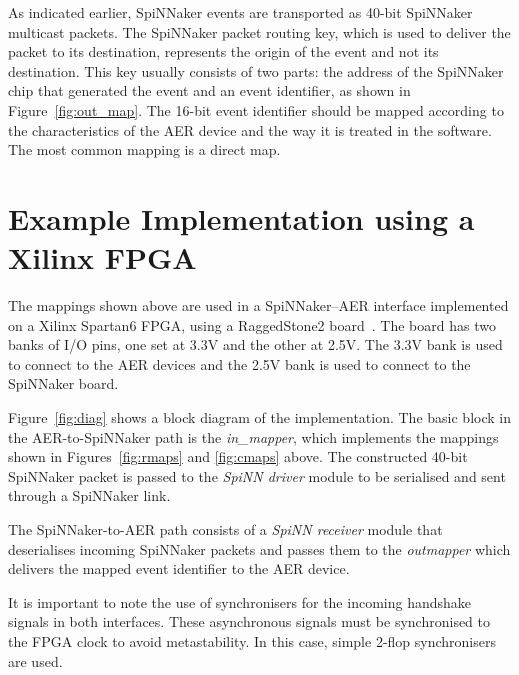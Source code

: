 As indicated earlier, SpiNNaker events are transported as 40-bit SpiNNaker multicast packets. The SpiNNaker packet routing key, which is used to deliver the packet to its destination, represents the origin of the event and not its destination. This key usually consists of two parts: the address of the SpiNNaker chip that generated the event and an event identifier, as shown in Figure~\ref{fig:out_map}. The 16-bit event identifier should be mapped according to the characteristics of the AER device and the way it is treated in the software. The most common mapping is a direct map.\\





\section{Example Implementation using a Xilinx FPGA}


The mappings shown above are used in a SpiNNaker--AER interface implemented on a Xilinx Spartan6 FPGA, using a RaggedStone2 board~\cite{ragged}. The board  has two banks of I/O pins, one set at 3.3V and the other at 2.5V. The 3.3V bank is used to connect to the AER devices and the 2.5V bank is used to connect to the SpiNNaker board.




Figure~\ref{fig:diag} shows a block diagram of the implementation. The basic block in the AER-to-SpiNNaker path is the \emph{in\_mapper}, which implements the mappings shown in Figures~\ref{fig:rmaps} and \ref{fig:cmaps} above. The constructed 40-bit SpiNNaker packet is passed to the \emph{SpiNN driver} module to be serialised and sent through a SpiNNaker link.

The SpiNNaker-to-AER path consists of a \emph{SpiNN receiver} module that deserialises incoming SpiNNaker packets and passes them to the \emph{out\-mapper} which delivers the mapped event identifier to the AER device.

It is important to note the use of synchronisers for the incoming handshake signals in both interfaces. These asynchronous signals must be synchronised to the FPGA clock to avoid metastability. In this case, simple 2-flop synchronisers are used.\\


